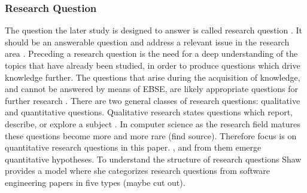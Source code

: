 \subsubsection{Research Question}

The question the later study is designed to answer is called research question \cite{Vickers}. It should be an answerable question and address a relevant issue in the research area \cite{Dyba2005}. Preceding a research question is the need for a deep understanding of the topics that have already been studied, in order to produce questions which drive knowledge further. The questions that arise during the acquisition of knowledge, and cannot be answered by means of EBSE, are likely appropriate questions for further research \cite{Farrugia2009}. \newline
There are two general classes of research questions: qualitative and quantitative questions. Qualitative research states questions which report, describe, or explore a subject \cite[p. 139-141]{Creswell2014}. In computer science as the research field matures these questions become more and more rare {\color{red} (find source)}. Therefore focus is on quantitative research questions in this paper.  \cite[p. 143]{Creswell2014}, and from them emerge quantitative hypotheses. \newline
To understand the structure of research questions Shaw provides a model where she categorizes research questions from software engineering papers in five types \cite{Shaw2002} {\color{red} (maybe cut out)}. \newline
